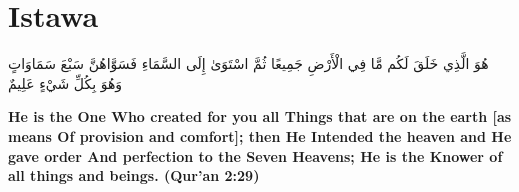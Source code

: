 \chapter{Istawa}
\begin{center}
    {\Huge    
        \begin{Arabic}
            هُوَ الَّذِي خَلَقَ لَكُم مَّا فِي الْأَرْضِ جَمِيعًا ثُمَّ اسْتَوَىٰ إِلَى السَّمَاءِ فَسَوَّاهُنَّ سَبْعَ سَمَاوَاتٍ وَهُوَ بِكُلِّ شَيْءٍ عَلِيمٌ
        \end{Arabic}
    }    
\end{center}
\vspace*{\fill}
\vspace{3cm}
\begin{center}
    \large \textbf{He is the One Who created for you all Things that are on the earth [as means Of provision and comfort]; then He Intended the heaven and He gave order And perfection to the Seven Heavens; He is the Knower of all things and beings. (Qur'an 2:29)}
\end{center}
